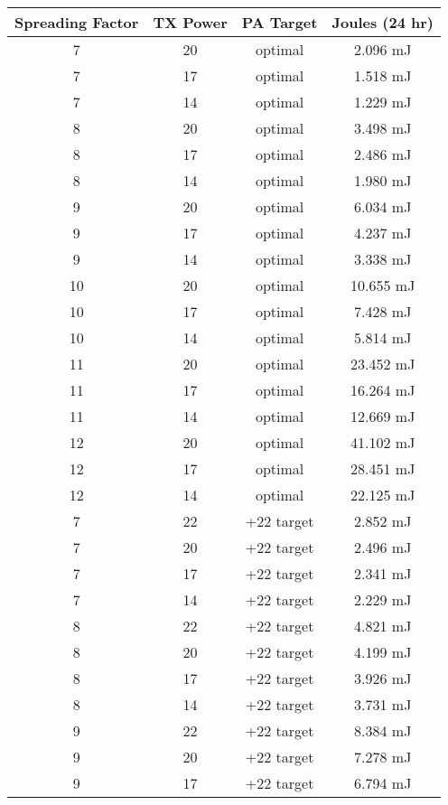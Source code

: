 \begin{table*}[ht!]
    \centering
    \small
    \begin{tabularx}{\columnwidth}{c c c c}
    \toprule
    Spreading Factor & TX Power & PA Target & Joules (24 hr) \\
    \midrule
    7 & 20 & optimal & 2.096 mJ \\
    7 & 17 & optimal & 1.518 mJ \\
    7 & 14 & optimal & 1.229 mJ \\
    \midrule
    8 & 20 & optimal & 3.498 mJ \\
    8 & 17 & optimal & 2.486 mJ \\
    8 & 14 & optimal & 1.980 mJ \\
    \midrule
    9 & 20 & optimal & 6.034 mJ \\
    9 & 17 & optimal & 4.237 mJ \\
    9 & 14 & optimal & 3.338 mJ \\
    \midrule
    10 & 20 & optimal & 10.655 mJ \\
    10 & 17 & optimal & 7.428 mJ \\
    10 & 14 & optimal & 5.814 mJ \\
    \midrule
    11 & 20 & optimal & 23.452 mJ \\
    11 & 17 & optimal & 16.264 mJ \\
    11 & 14 & optimal & 12.669 mJ \\
    \midrule
    12 & 20 & optimal & 41.102 mJ \\
    12 & 17 & optimal & 28.451 mJ \\
    12 & 14 & optimal & 22.125 mJ \\
    \midrule
    7 & 22 & +22 target & 2.852 mJ \\
    7 & 20 & +22 target & 2.496 mJ \\
    7 & 17 & +22 target & 2.341 mJ \\
    7 & 14 & +22 target & 2.229 mJ \\
    \midrule
    8 & 22 & +22 target & 4.821 mJ \\
    8 & 20 & +22 target & 4.199 mJ \\
    8 & 17 & +22 target & 3.926 mJ \\
    8 & 14 & +22 target & 3.731 mJ \\
    \midrule
    9 & 22 & +22 target & 8.384 mJ \\
    9 & 20 & +22 target & 7.278 mJ \\
    9 & 17 & +22 target & 6.794 mJ \\

\end{tabularx}
\end{table*}
